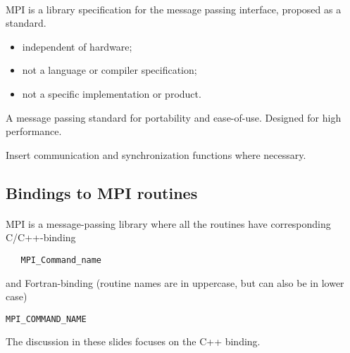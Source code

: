 \paragraph{}
MPI is a library specification for the message passing interface,
proposed as a standard.

\begin{itemize}
\item independent of hardware;

\item not a language or compiler specification;

\item not a specific implementation or product.
\end{itemize}

\noindent
A message passing standard for portability and ease-of-use. 
Designed for high performance.

Insert communication and synchronization functions where necessary.



\subsection*{Bindings to MPI routines}

\paragraph{}

MPI is a message-passing library where all the routines
have corresponding C/C++-binding


\begin{verbatim}
   MPI_Command_name

\end{verbatim}

and Fortran-binding (routine names are in uppercase, but can also be in lower case)


\begin{Verbatim}[numbers=none,fontsize=\fontsize{9pt}{9pt},baselinestretch=0.95]
   MPI_COMMAND_NAME

\end{Verbatim}

The discussion in these slides focuses on the C++ binding.



